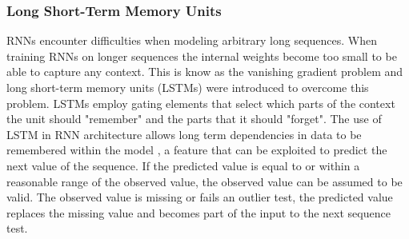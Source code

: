 \subsubsection{Long Short-Term Memory Units}
RNNs encounter difficulties when modeling arbitrary long sequences. When training RNNs on longer sequences the internal weights become too small to be able to capture any context. This is know as the vanishing gradient problem and long short-term memory units (LSTMs) were introduced to overcome this problem\cite{DBLP:journals/corr/Lipton15}. LSTMs employ gating elements that select which parts of the context the unit should "remember" and the parts that it should "forget"\cite{LSTM}.
The use of LSTM in RNN architecture allows long term dependencies in data to be remembered within the model \citep{Graves2013a}, a feature that can be exploited to predict the next value of the sequence. If the predicted value is equal to or within a reasonable range of the observed value, the observed value can be assumed to be valid. The observed value is missing or fails an outlier test, the predicted value replaces the missing value and becomes part of the input to the next sequence test.